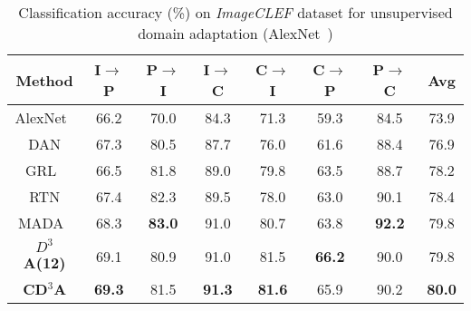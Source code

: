 \documentclass{bmvc2k}
\begin{document}
\begin{table*}[!h]
\centering
\begin{tabular}{ |c|c|c|c|c|c|c|c| }
 \hline
  \textbf{Method }& I$\rightarrow$P & P$\rightarrow$I &  I$\rightarrow$C &C$\rightarrow$I & C$\rightarrow$P & P$\rightarrow$C & Avg \\ 
 \hline
AlexNet~\cite{krizhevsky_NIPS2012} & 66.2 & 70.0 & 84.3 & 71.3 & 59.3 &84.5 & 73.9  \\
DAN\cite{long_ICML2015} & 67.3 & 80.5 & 87.7 & 76.0 & 61.6 & 88.4 & 76.9  \\
GRL~\cite{ganin_ICML2015} & 66.5 & 81.8 & 89.0 & 79.8 &63.5 &88.7 &78.2  \\
RTN\cite{long_NIPS2016} & 67.4 & 82.3 &89.5 & 78.0 &63.0 &90.1 &78.4  \\
MADA~\cite{pei_arxiv2018} & 68.3 &\textbf{83.0} &91.0 &80.7 &63.8 & \textbf{92.2} &79.8  \\
\hline
\textbf{$D^{3}$A(12)} & {69.1} & {80.9} &  {91.0} & {81.5} &  \textbf{66.2}  &  {90.0} & {79.8} \\
 \hline
 \textbf{CD$^{3}$A}&\textbf{69.3}& 81.5 & \textbf{91.3} &\textbf{ 81.6} &{ 65.9} & {{90.2}} & \textbf{80.0}\\ 
 \hline
\end{tabular}
\vspace{1em}
\caption {Classification accuracy (\%) on \textit{ImageCLEF} dataset for unsupervised domain adaptation (AlexNet~\cite{krizhevsky_NIPS2012})\label{tbl:imageclef}} 
 \end{table*}
\end{document}
